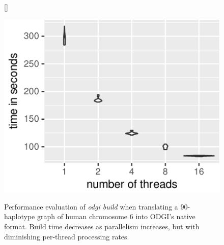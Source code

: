 \vspace{-1em}
\begin{figure}[ht!]
{}[\FBwidth]
         {\caption{Performance evaluation of \textit{odgi build} when translating a 90-haplotype graph of human chromosome 6 into ODGI's native format.
             Build time decreases as parallelism increases, but with diminishing per-thread processing rates.
           }\label{fig:build}}
         {\includegraphics[width=\linewidth]{fig/build/mean_build_time.pdf}} %
	
\end{figure}
\vspace{-1em}
